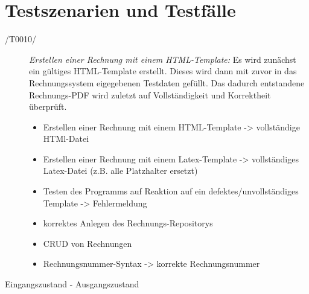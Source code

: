 
\section{Testszenarien und Testfälle}



\begin{description}
  \item[/T0010/]
    \textit{Erstellen einer Rechnung mit einem HTML-Template:}
   Es wird zunächst ein gültiges HTML-Template erstellt. Dieses wird dann mit zuvor in das Rechnungssystem eigegebenen Testdaten gefüllt. Das dadurch entstandene Rechnungs-PDF wird zuletzt auf Vollständigkeit und Korrektheit überprüft.
	\begin{itemize}
   		\item Erstellen einer Rechnung mit einem HTML-Template -> vollständige HTMl-Datei
		\item Erstellen einer Rechnung mit einem Latex-Template -> vollständiges Latex-Datei (z.B. alle Platzhalter ersetzt)
		\item Testen des Programms auf Reaktion auf ein defektes/unvollständiges Template -> Fehlermeldung
		\item korrektes Anlegen des Rechnungs-Repositorys 
		\item CRUD von Rechnungen
		\item Rechnungsnummer-Syntax -> korrekte Rechnungsnummer
   \end{itemize}
\end{description}

Eingangszustand - Ausgangszustand


